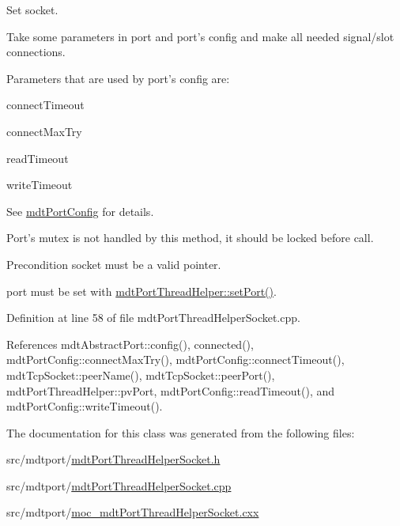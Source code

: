 Set socket. 

Take some parameters in port and port's config and make all needed signal/slot connections.

Parameters that are used by port's config are\-:
\begin{DoxyItemize}
\item connect\-Timeout
\item connect\-Max\-Try
\item read\-Timeout
\item write\-Timeout
\end{DoxyItemize}

See \hyperlink{classmdt_port_config}{mdt\-Port\-Config} for details.

Port's mutex is not handled by this method, it should be locked before call.

\begin{DoxyPrecond}{Precondition}
socket must be a valid pointer. 

port must be set with \hyperlink{classmdt_port_thread_helper_a4127c0b28dc63df06b5a36a4be8b3bb7}{mdt\-Port\-Thread\-Helper\-::set\-Port()}. 
\end{DoxyPrecond}


Definition at line 58 of file mdt\-Port\-Thread\-Helper\-Socket.\-cpp.



References mdt\-Abstract\-Port\-::config(), connected(), mdt\-Port\-Config\-::connect\-Max\-Try(), mdt\-Port\-Config\-::connect\-Timeout(), mdt\-Tcp\-Socket\-::peer\-Name(), mdt\-Tcp\-Socket\-::peer\-Port(), mdt\-Port\-Thread\-Helper\-::pv\-Port, mdt\-Port\-Config\-::read\-Timeout(), and mdt\-Port\-Config\-::write\-Timeout().



The documentation for this class was generated from the following files\-:\begin{DoxyCompactItemize}
\item 
src/mdtport/\hyperlink{mdt_port_thread_helper_socket_8h}{mdt\-Port\-Thread\-Helper\-Socket.\-h}\item 
src/mdtport/\hyperlink{mdt_port_thread_helper_socket_8cpp}{mdt\-Port\-Thread\-Helper\-Socket.\-cpp}\item 
src/mdtport/\hyperlink{moc__mdt_port_thread_helper_socket_8cxx}{moc\-\_\-mdt\-Port\-Thread\-Helper\-Socket.\-cxx}\end{DoxyCompactItemize}

